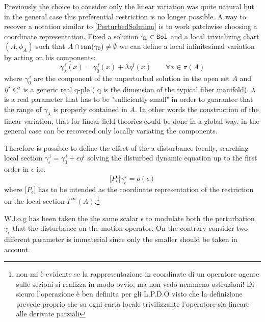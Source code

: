 \documentclass[Main]{subfiles}
\begin{document}
		Previously the choice to consider only the linear variation was quite natural but in the general case this preferential restriction is no longer possible.
		A way to  recover a notation similar to \ref{PerturbedSolution} is to work patchwise choosing a coordinate representation.
		Fixed a solution $\gamma_0 \in \mathtt{Sol}$ and a local trivializing chart $(A, \phi_A)$ such that $A\cap \mathrm{ran}(\gamma_0) \neq \emptyset$ we can define a local infinitesimal variation by acting on his components:
		\begin{displaymath}
			\gamma_\lambda ^{\, i}(x) = \gamma_0^{\, i}(x) + \lambda \eta^i(x) \qquad \forall x\in \pi(A)
		\end{displaymath}
		where $ \gamma_0^{\, i}$ are the component of the unperturbed solution in the open set $A$ and $\eta^i\in \real^q$ is a generic real q-ple ( q is the dimension of the typical fiber manifold).
		$\lambda$ is a real parameter that has to be "sufficiently small" in order to guarantee that the range of $\gamma_\lambda$ is properly contained in $A$.
		In other words the construction of the linear variation, that for linear field theories could be done in a global way, in the general case can be recovered only locally variating the components.
		
		Therefore is possible to define the effect of the a disturbance locally, searching local section $\gamma_\epsilon^{\, i} = \gamma_0^{\, i} + \epsilon \eta^{i}$ solving the disturbed dynamic equation up to the first order in $\epsilon$ i.e. 
		\begin{displaymath}
			\big[ P_\epsilon \big] \gamma_\epsilon^{\,i} = o(\epsilon)
		\end{displaymath}
		where $\big[ P_\epsilon \big] $ has to be intended as the coordinate representation of the restriction on the local section $\Gamma^\infty(A)$.\danger\footnote{non mi è evidente se la rappresentazione in coordinate di un operatore agente sulle sezioni si realizza in modo ovvio, ma non vedo nemmeno ostruzioni! Di sicuro l'operazione è ben definita per gli L.P.D.O visto che la definizione prevede proprio che su ogni carta locale trivilizzante l'operatore sia lineare alle derivate parziali }
		\begin{observation}
		W.l.o.g has been taken the the same scalar $\epsilon$  to modulate both the perturbation $\gamma_\epsilon$ that the disturbance on the motion operator.
		On the contrary consider two different parameter is immaterial since only the smaller should be taken in account.
		\end{observation}
\end{document}
